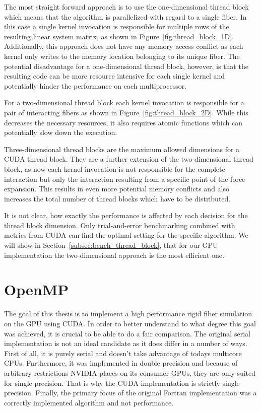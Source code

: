 The most straight forward approach is to use the one-dimensional thread block which means that the algorithm is parallelized with regard to a single fiber. In this case a single kernel invocation is responsible for multiple rows of the resulting linear system matrix, as shown in Figure~\ref{fig:thread_block_1D}. Additionally, this approach does not have any memory access conflict as each kernel only writes to the memory location belonging to its unique fiber. The potential disadvantage for a one-dimensional thread block, however, is that the resulting code can be more resource intensive for each single kernel and potentially hinder the performance on each multiprocessor.

For a two-dimensional thread block each kernel invocation is responsible for a pair of interacting fibers as shown in Figure~\ref{fig:thread_block_2D}. While this decreases the necessary resources, it also requires atomic functions which can potentially slow down the execution. 

Three-dimensional thread blocks are the maximum allowed dimensions for a CUDA thread block. They are a further extension of the two-dimensional thread block, as now each kernel invocation is not responsible for the complete interaction but only the interaction resulting from a specific point of the force expansion. This results in even more potential memory conflicts and also increases the total number of thread blocks which have to be distributed.

It is not clear, how exactly the performance is affected by each decision for the thread block dimension. Only trial-and-error benchmarking combined with metrics from CUDA can find the optimal setting for the specific algorithm. We will show in Section~\ref{subsec:bench_thread_block}, that for our GPU implementation the two-dimensional approach is the most efficient one.

\section{OpenMP}

The goal of this thesis is to implement a high performance rigid fiber simulation on the GPU using CUDA. In order to better understand to what degree this goal was achieved, it is crucial to be able to do a fair comparison. The original serial implementation is not an ideal candidate as it does differ in a number of ways. First of all, it is purely serial and doesn't take advantage of todays multicore CPUs. Furthermore, it was implemented in double precision and because of arbitrary restrictions NVIDIA places on its consumer GPUs, they are only suited for single precision. That is why the CUDA implementation is strictly single precision. Finally, the primary focus of the original Fortran implementation was a correctly implemented algorithm and not performance.

